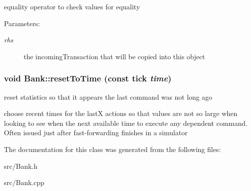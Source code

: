 equality operator to check values for equality 

\begin{Desc}
\item[Parameters:]
\begin{description}
\item[{\em rhs}]the incomingTransaction that will be copied into this object \end{description}
\end{Desc}
\subsubsection[{resetToTime}]{\setlength{\rightskip}{0pt plus 5cm}void Bank::resetToTime (const tick {\em time})}\label{class_d_r_a_msim_i_i_1_1_bank_79b5b7f7e8541bea8742f5cb7d8045db}


reset statistics so that it appears the last command was not long ago 

choose recent times for the lastX actions so that values are not so large when looking to see when the next available time to execute any dependent command. Often issued just after fast-forwarding finishes in a simulator 

The documentation for this class was generated from the following files:\begin{CompactItemize}
\item 
src/Bank.h\item 
src/Bank.cpp\end{CompactItemize}
